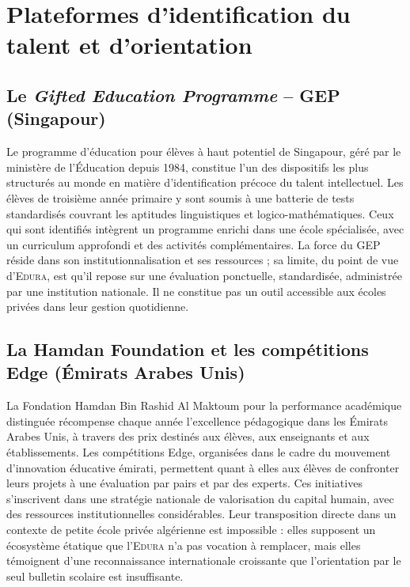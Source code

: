 \documentclass[12pt,a4paper,oneside]{report}
\newcommand{\edura}{\textsc{Edura}}
\begin{document}
\section{Plateformes d'identification du talent et d'orientation}

\subsection{Le \textit{Gifted Education Programme} -- GEP (Singapour)}

Le programme d'éducation pour élèves à haut potentiel de Singapour, géré par le ministère de l'Éducation depuis 1984, constitue l'un des dispositifs les plus structurés au monde en matière d'identification précoce du talent intellectuel. Les élèves de troisième année primaire y sont soumis à une batterie de tests standardisés couvrant les aptitudes linguistiques et logico-mathématiques. Ceux qui sont identifiés intègrent un programme enrichi dans une école spécialisée, avec un curriculum approfondi et des activités complémentaires. La force du GEP réside dans son institutionnalisation et ses ressources ; sa limite, du point de vue d'\edura{}, est qu'il repose sur une évaluation ponctuelle, standardisée, administrée par une institution nationale. Il ne constitue pas un outil accessible aux écoles privées dans leur gestion quotidienne.

\subsection{La Hamdan Foundation et les compétitions Edge (Émirats Arabes Unis)}

La Fondation Hamdan Bin Rashid Al Maktoum pour la performance académique distinguée récompense chaque année l'excellence pédagogique dans les Émirats Arabes Unis, à travers des prix destinés aux élèves, aux enseignants et aux établissements. Les compétitions Edge, organisées dans le cadre du mouvement d'innovation éducative émirati, permettent quant à elles aux élèves de confronter leurs projets à une évaluation par pairs et par des experts. Ces initiatives s'inscrivent dans une stratégie nationale de valorisation du capital humain, avec des ressources institutionnelles considérables. Leur transposition directe dans un contexte de petite école privée algérienne est impossible : elles supposent un écosystème étatique que l'\edura{} n'a pas vocation à remplacer, mais elles témoignent d'une reconnaissance internationale croissante que l'orientation par le seul bulletin scolaire est insuffisante.
\end{document}
